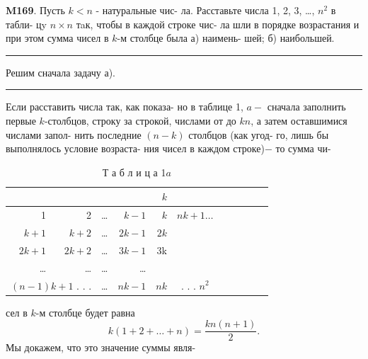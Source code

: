 \documentclass[12pt]{article}
\begin{document}
\begin{multicols}{2}
\parindent21pt
\textbf{M169}. Пусть $k < n$ - натуральные чис-\linebreak
ла. Расставьте числа 1, 2, 3, \dots, $n^{2}$ в табли-\linebreak
цy $n \times n$ тaк, чтобы в каждой строке чис-\linebreak
ла шли в порядке возрастания и при этом\linebreak
сумма чисел в $k$-м столбце была а) наимень-\linebreak
шей; б) наибольшей. \\
\rule{0.85cm} РРешим сначала задачу а).\\
\rule{0.85cm} ЕЕсли расставить числа так, как показа-\linebreak
но в таблице 1, $a-$ сначала заполнить первые\linebreak
$k$-столбцов, строку за строкой, числами от до $kn$, а затем оставшимися числами запол-\linebreak
нить последние $(n - k)$ столбцов (как угод-\linebreak
го, лишь бы выполнялось условие возраста-\linebreak
ния чисел в каждом строке)$-$ то сумма чи-\allowdisplaybreaks 
\begin{table}[H]
  \captionsetup{singlelinecheck=off}
  \caption*{Т а б л и ц а  1$a$}
\begin{tabular}{ |r r r r|r| c| } 
 &  &  \\ 
 & 2 & \dots & $k - 1$ & $k$ & $nk + 1 \dots$ \\ 
 $k + 1$ & $k + 2$ & \dots & $2k - 1$ & $2k$ &  \\ 
 $2k + 1$ & $2k + 2$ & \dots & $3k - 1$ & 3k &  \\
 \dots & \dots & \dots & \dots &  & \\
 & \dots & $nk - 1$ & $nk$ & {.    .    .    $n^{2}$}
  & & & & & & \\
 \hline
\end{tabular}
\label{table:1}
\end{table}
\parindent0pt
сел в $k$-м столбце будет равна
\setcounter{equation}{0}
\begin{equation}
k(1 + 2 + \ldots + n) = \frac{kn(n + 1)}{2}.
\label{eq:eq11}
\end{equation}
Мы докажем, что это значение суммы явля-\linebreak

\end{multicols}
\end{document}
